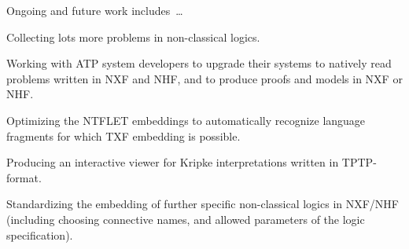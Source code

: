 \documentclass[runningheads]{llncs}
\newenvironment{packed_itemize}{
\vspace*{-0.5em}
\begin{itemize}
\setlength{\partopsep}{0pt}
\setlength{\itemsep}{1pt}
\setlength{\parskip}{0pt}
\setlength{\parsep}{0pt}
}{\end{itemize}}
\begin{document}
Ongoing and future work includes~\ldots
\begin{packed_itemize}
\item Collecting lots more problems in non-classical logics.
\item Working with ATP system developers to upgrade their systems to natively read problems 
      written in NXF and NHF, and to produce proofs and models in NXF or NHF.
\item Optimizing the NTFLET embeddings to automatically recognize language fragments for which
      TXF embedding is possible.
\item Producing an interactive viewer for Kripke interpretations written in TPTP-format.
\item Standardizing the embedding of further specific non-classical logics in NXF/NHF (including
      choosing connective names, and allowed parameters of the logic specification).
\end{packed_itemize}



\end{document}
